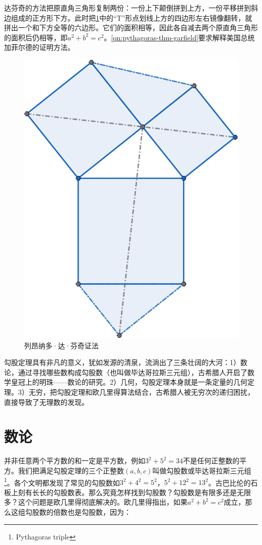 \documentclass[b5paper]{ctexart}
\begin{document}
达芬奇的方法把原直角三角形复制两份：一份上下颠倒拼到上方，一份平移拼到斜边组成的正方形下方。此时把\cref{fig:davinci}中的“T”形点划线上方的四边形左右镜像翻转，就拼出一个和下方全等的六边形。它们的面积相等，因此各自减去两个原直角三角形的面积后仍相等，即$a^2 + b^2 = c^2$。\cref{qn:pythagoras-thm-garfield}要求解释美国总统加菲尔德的证明方法。

\begin{figure}[htbp]
 \centering
 \includegraphics[scale=0.3]{img/davinci}
 \caption{列昂纳多·达·芬奇证法\label{fig:davinci}}
\end{figure}

勾股定理具有非凡的意义，犹如发源的清泉，流淌出了三条壮阔的大河\cite{Stillwell-2010}：1）数论，通过寻找哪些数构成勾股数（也叫做毕达哥拉斯三元组），古希腊人开启了数学皇冠上的明珠——数论的研究。2）几何，勾股定理本身就是一条定量的几何定理。3）无穷，把勾股定理和欧几里得算法结合，古希腊人被无穷次的递归困扰，直接导致了无理数的发现。

\section{数论}
并非任意两个平方数的和一定是平方数，例如$3^2 + 5^2 = 34$不是任何正整数的平方。我们把满足勾股定理的三个正整数$(a, b, c)$叫做勾股数或毕达哥拉斯三元组\footnote{Pythagoras triple}。各个文明都发现了常见的勾股数如$3^2 + 4^2 = 5^2$，$5^2 + 12^2 = 13^2$。古巴比伦的石板上刻有长长的勾股数表。那么究竟怎样找到勾股数？勾股数是有限多还是无限多？这个问题是欧几里得彻底解决的。欧几里得指出，如果$a^2 + b^2 = c^2$成立，那么这组勾股数的倍数也是勾股数，因为：
\end{document}
